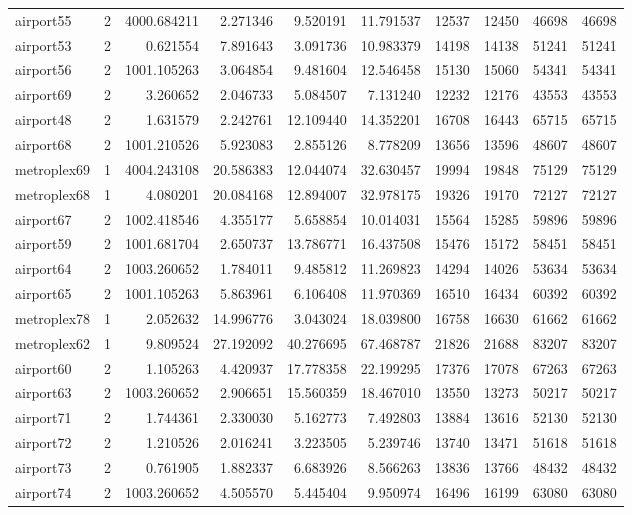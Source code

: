 \begin{longtable}{|l|r|r|r|r|r|r|r|r|r|}
airport55 & 2 & 4000.684211 & 2.271346 & 9.520191 & 11.791537 & 12537 & 12450 & 46698 & 46698 \\
airport53 & 2 & 0.621554 & 7.891643 & 3.091736 & 10.983379 & 14198 & 14138 & 51241 & 51241 \\
airport56 & 2 & 1001.105263 & 3.064854 & 9.481604 & 12.546458 & 15130 & 15060 & 54341 & 54341 \\
airport69 & 2 & 3.260652 & 2.046733 & 5.084507 & 7.131240 & 12232 & 12176 & 43553 & 43553 \\
airport48 & 2 & 1.631579 & 2.242761 & 12.109440 & 14.352201 & 16708 & 16443 & 65715 & 65715 \\
airport68 & 2 & 1001.210526 & 5.923083 & 2.855126 & 8.778209 & 13656 & 13596 & 48607 & 48607 \\
metroplex69 & 1 & 4004.243108 & 20.586383 & 12.044074 & 32.630457 & 19994 & 19848 & 75129 & 75129 \\
metroplex68 & 1 & 4.080201 & 20.084168 & 12.894007 & 32.978175 & 19326 & 19170 & 72127 & 72127 \\
airport67 & 2 & 1002.418546 & 4.355177 & 5.658854 & 10.014031 & 15564 & 15285 & 59896 & 59896 \\
airport59 & 2 & 1001.681704 & 2.650737 & 13.786771 & 16.437508 & 15476 & 15172 & 58451 & 58451 \\
airport64 & 2 & 1003.260652 & 1.784011 & 9.485812 & 11.269823 & 14294 & 14026 & 53634 & 53634 \\
airport65 & 2 & 1001.105263 & 5.863961 & 6.106408 & 11.970369 & 16510 & 16434 & 60392 & 60392 \\
metroplex78 & 1 & 2.052632 & 14.996776 & 3.043024 & 18.039800 & 16758 & 16630 & 61662 & 61662 \\
metroplex62 & 1 & 9.809524 & 27.192092 & 40.276695 & 67.468787 & 21826 & 21688 & 83207 & 83207 \\
airport60 & 2 & 1.105263 & 4.420937 & 17.778358 & 22.199295 & 17376 & 17078 & 67263 & 67263 \\
airport63 & 2 & 1003.260652 & 2.906651 & 15.560359 & 18.467010 & 13550 & 13273 & 50217 & 50217 \\
airport71 & 2 & 1.744361 & 2.330030 & 5.162773 & 7.492803 & 13884 & 13616 & 52130 & 52130 \\
airport72 & 2 & 1.210526 & 2.016241 & 3.223505 & 5.239746 & 13740 & 13471 & 51618 & 51618 \\
airport73 & 2 & 0.761905 & 1.882337 & 6.683926 & 8.566263 & 13836 & 13766 & 48432 & 48432 \\
airport74 & 2 & 1003.260652 & 4.505570 & 5.445404 & 9.950974 & 16496 & 16199 & 63080 & 63080 \\

\end{longtable}
